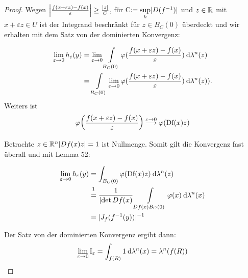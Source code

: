 \documentclass[skript.tex]{subfiles}
\begin{document}
\begin{proof}
		Wegen $\left| \frac{f(x+ \varepsilon z) - f(x)}{\varepsilon} \right| \geq \frac{\lvert z \rvert}{C}$, für C$\coloneqq \sup\limits_{k} \lvert D(f^{-1}) \rvert$ und $z \in \mathbb{R}$ mit $x + \varepsilon z \in U$ ist der Integrand beschränkt für $ z \in B_C(0)$ überdeckt und wir erhalten mit dem Satz von der dominierten Konvergenz:
	
		\begin{align*}
		\lim\limits_{\varepsilon \to 0} h_{\varepsilon}(y)
	&	= \lim\limits_{\varepsilon \to 0}  \int\limits_{B_C(0)} \varphi(\frac{f(x+ \varepsilon z) - f(x)}{\varepsilon}) \: \mathrm{d} \lambda^n(z) \\
    &	= \int\limits_{B_C(0)} \lim\limits_{\varepsilon \to 0} \varphi(\frac{f(x+ \varepsilon z) - f(x)}{\varepsilon}) \: \mathrm{d} \lambda^n(z)).
		\end{align*}
		Weiters ist
		\begin{equation*}
		\varphi\pr{\frac{f(x+ \varepsilon z) - f(x)}{\varepsilon}} \stackrel{ \varepsilon \to 0}{\lra} \varphi (\text{Df}(x)z)
		\end{equation*}
		
		Betrachte {$z \in \mathbb{R}^n \lvert Df(x)z \rvert = 1$} ist Nullmenge. Somit gilt die Konvergenz fast überall und mit Lemma 52:
		
		\begin{align*}
		\lim\limits_{\varepsilon \to 0} h_{\varepsilon}(y) &= \int_{B_C(0)} \varphi(\text{Df}(x)z) \md \lambda^n(z) \\
		&	\stackrel{\footnotemark}{=} \frac{1}{\lvert \det Df(x)} \lint_{Df(x)B_C(0)}\varphi(x) \md \lambda^n(x) \\
		&  =\lvert J_f (f^{-1}(y))\rvert^{-1}
		\end{align*}
		
		Der Satz von der dominierten Konvergenz ergibt dann:
		\begin{equation*}
		\lim\limits_{\varepsilon \to 0} \text{I}_{\varepsilon} = \int_{f(R)} 1 \: \mathrm{d} \lambda^n(x) = \lambda^n(f(R))
		\end{equation*}
		

\end{proof}
\end{document}
